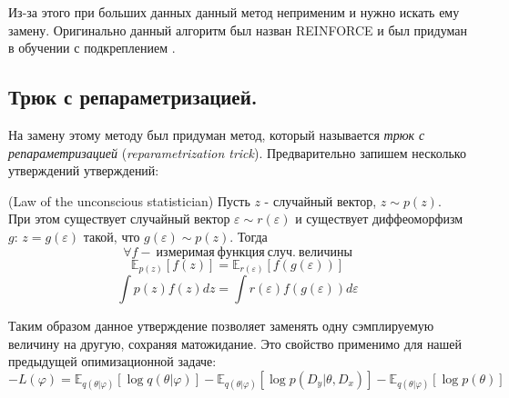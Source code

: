  Из-за этого при больших данных данный метод неприменим и нужно искать ему замену. Оригинально данный алгоритм был назван REINFORCE и был придуман
 в обучении с подкреплением \cite{williams:92}.

\subsection{Трюк с репараметризацией.}

На замену этому методу был придуман метод, который называется \textit{трюк с репараметризацией} (\textit{reparametrization trick})\cite{auto-encod-bayes}.
 Предварительно запишем несколько утверждений утверждений:

\begin{proposition}
    (Law of the unconscious statistician)
    \label{LOTUS}
    Пусть $z$ - случайный вектор, $z \sim p(z)$. При этом существует случайный вектор $\varepsilon \sim r(\varepsilon)$ и существует диффеоморфизм $g$: $z = g(\varepsilon)$ такой,
     что $g(\varepsilon) \sim p(z)$. Тогда
    $$\forall f -\ измеримая\ функция\ случ.\ величины$$
    $$\mathbb{E}_{p(z)}[f(z)] = \mathbb{E}_{r(\varepsilon)}[f(g(\varepsilon))]$$
    $$\int p(z) f(z) dz = \int r(\varepsilon) f(g(\varepsilon)) d\varepsilon$$
\end{proposition}

Таким образом данное утверждение позволяет заменять одну сэмплируемую величину на другую, сохраняя матожидание. Это свойство
 применимо для нашей предыдущей опимизационной задаче:
$$-L(\varphi) = \mathbb{E}_{q(\theta | \varphi)}[\log q(\theta | \varphi)] - \mathbb{E}_{q(\theta | \varphi)}[\log p(D_y | \theta, D_x)] - \mathbb{E}_{q(\theta | \varphi)}[\log p(\theta)]$$

